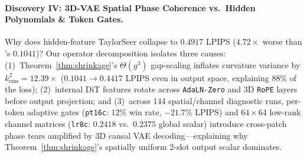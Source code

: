 \paragraph{Discovery IV: 3D-VAE Spatial Phase Coherence vs.\ Hidden Polynomials \& Token Gates.}
Why does hidden-feature TaylorSeer collapse to $0.4917$ LPIPS ($4.72\times$ worse than \method{}'s $0.1041$)? Our operator decomposition isolates three causes: (1)~Theorem~\ref{thm:shrinkage}'s $\Theta(g^3)$ gap-scaling inflates curvature variance by $k_{\mathrm{rms}}^2 = \mathbf{12.39\times}$ ($0.1041 \to 0.4417$ LPIPS even in output space, explaining $88\%$ of the loss); (2)~internal DiT features rotate across \texttt{AdaLN-Zero} and 3D \texttt{RoPE} layers before output projection; and (3)~across 144 spatial/channel diagnostic runs, per-token adaptive gates (\texttt{pt16c}: $12\%$ win rate, $-21.7\%$ LPIPS) and $64{\times}64$ low-rank channel matrices (\texttt{lr8c}: $0.2418$ vs.\ $0.2375$ global scalar) introduce cross-patch phase tears amplified by 3D causal VAE decoding---explaining why Theorem~\ref{thm:shrinkage}'s spatially uniform 2-slot output scalar dominates.
